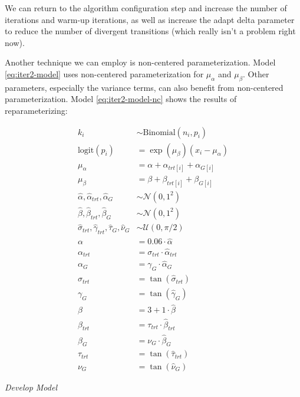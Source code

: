 \documentclass[11pt, oneside, openany]{scrbook}
\begin{document}
We can return to the algorithm configuration step and increase the number of iterations and warm-up iterations, as well as increase the adapt delta parameter to reduce the number of divergent transitions (which really isn't a problem right now).

Another technique we can employ is non-centered parameterization. Model \eqref{eq:iter2-model} uses non-centered parameterization for \(\mu_\alpha\) and \(\mu_\beta\). Other parameters, especially the variance terms, can also benefit from non-centered parameterization. Model \eqref{eq:iter2-model-nc} shows the results of reparameterizing:


\begin{equation}
\begin{split}
k_i &\sim \mathrm{Binomial}(n_i, p_i) \\
\mathrm{logit}(p_i) &= \exp(\mu_\beta) (x_i - \mu_\alpha) \\
\mu_\alpha &= \alpha + \alpha_{trt[i]} + \alpha_{G[i]} \\
\mu_\beta &= \beta + \beta_{trt[i]} + \beta_{G[i]} \\
\hat{\alpha}, \hat{\alpha}_{trt}, \hat{\alpha}_{G} &\sim \mathcal{N}(0, 1^2) \\
\hat{\beta}, \hat{\beta}_{trt}, \hat{\beta}_{G} &\sim \mathcal{N}(0, 1^2) \\
\hat{\sigma}_{trt}, \hat{\gamma}_{trt}, \hat{\tau}_{G}, \hat{\nu}_{G} &\sim \mathcal{U}(0, \pi/2) \\
\alpha &= 0.06 \cdot \hat{\alpha} \\
\alpha_{trt} &= \sigma_{trt} \cdot \hat{\alpha}_{trt} \\
\alpha_{G} &= \gamma_{G} \cdot \hat{\alpha}_{G} \\
\sigma_{trt} &= \tan(\hat{\sigma}_{trt}) \\
\gamma_{G} &= \tan(\hat{\gamma}_{G}) \\
\beta &= 3 + 1 \cdot \hat{\beta} \\
\beta_{trt} &= \tau_{trt} \cdot \hat{\beta}_{trt} \\
\beta_{G} &= \nu_{G} \cdot \hat{\beta}_{G} \\
\tau_{trt} &= \tan(\hat{\tau}_{trt}) \\
\nu_{G} &= \tan(\hat{\nu}_{G})
\end{split}
\label{eq:iter2-model-nc}
\end{equation}

\emph{Develop Model}
\end{document}
